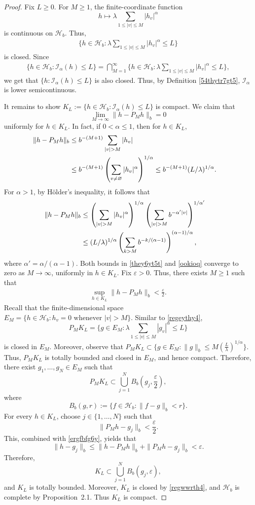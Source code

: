 \documentclass[a4paper, 11pt]{article}
\newcommand{\1}{\mathbf 1}
\theoremstyle{plain}
\begin{document}
\begin{proof}
Fix $L\geq0$. For \(M\geq1\), the finite-coordinate function
\[
  h\longmapsto
  \lambda\sum_{1\leq|v|\leq M}|h_v|^\alpha
\]
is continuous on \(\mathcal{H}_b\). Thus,
\begin{align}\label{regeythy4}
\Big\{h\in\mathcal{H}_b: \lambda\sum_{1\leq|v|\leq M}|h_v|^\alpha\leq L\Big\}
\end{align}
 is closed. Since
\begin{align}\label{regwwrth4}
\{h\in\mathcal{H}_b:\mathcal{I_{\alpha}}(h)\leq L\}=\bigcap^{\infty}_{M=1}\Big\{h\in\mathcal{H}_b: \lambda\sum_{1\leq|v|\leq M}|h_v|^\alpha\leq L\Big\},
\end{align}
we get that $\{h:\mathcal{I_{\alpha}}(h)\leq L\}$ is also closed. Thus, by Definition \ref{54thytr7gt5}, $\mathcal{I_{\alpha}}$ is lower semicontinuous.
\par
 It remains to show \(K_L:=\{h\in\mathcal{H}_b:\mathcal{I_{\alpha}}(h)\leq L\}\) is compact.  We claim that
 $$\lim_{M\to\infty} \|h-P_Mh\|_b=0$$
uniformly for \(h\in K_L\). In fact, if
\(0<\alpha\leq1\), then for \(h\in K_L\),
\begin{align}\label{they6yt5t}
  \|h-P_Mh\|_b
  &\leq
  b^{-(M+1)}
  \sum_{|v|>M}|h_v|\cr
  &\leq  b^{-(M+1)}\left(\sum_{v\neq \varnothing}|h_v|^{\alpha}\right)^{1/\alpha}
  \leq
  b^{-(M+1)}(L/\lambda)^{1/\alpha}.
\end{align}
For \(\alpha>1\), by H\"older's inequality, it follows that
\begin{align}\label{ookioq}
  \|h-P_Mh\|_b
  &\leq
  \left(\sum_{|v|>M}|h_v|^\alpha\right)^{1/\alpha}
  \left(\sum_{|v|>M}b^{-\alpha'|v|}\right)^{1/\alpha'}\cr
  &\leq
  (L/\lambda)^{1/\alpha}
  \left(\sum_{k>M}b^{-k/(\alpha-1)}\right)^{(\alpha-1)/\alpha},
\end{align}
where \(\alpha'=\alpha/(\alpha-1)\). Both bounds in \eqref{they6yt5t} and \eqref{ookioq} converge to zero as \(M\to\infty\), uniformly in \(h\in K_L\). Fix \(\varepsilon>0\). Thus, there exists \(M\geq1\) such that
\begin{align}\label{ergfbfg6y}
\sup_{h\in K_L}\|h-P_Mh\|_b<\frac{\varepsilon}{2}.
\end{align}
Recall that the finite-dimensional space \(E_M=\{h\in\mathcal{H}_b:h_v=0\text{ whenever }|v|>M\}\). Similar to \eqref{regeythy4},
$$P_MK_L=\Bigg\{g\in E_M: \lambda\sum_{1\leq|v|\leq M}|g_v|^{\alpha}\leq L\Bigg\}$$
is closed in \(E_M\). Moreover, observe that $P_MK_L\subset\{g\in E_M: \|g\|_b\leq M(\frac{L}{\lambda})^{1/\alpha}\}$. Thus, $P_MK_L$ is totally bounded and closed in \(E_M\), and hence compact.  Therefore, there exist \(g_1,\ldots,g_N\in E_M\) such that
\[
P_MK_L
\subset
\bigcup_{j=1}^{N}
B_b\left(g_j,\frac{\varepsilon}{2}\right),
\]
where
\[
B_b(g,r):=\{f\in\mathcal H_b:\|f-g\|_b<r\}.
\]
For every \(h\in K_L\), choose \(j\in\{1,\ldots,N\}\) such that
\[
\|P_Mh-g_j\|_b<\frac{\varepsilon}{2}.
\]
This, combined with \eqref{ergfbfg6y}, yields that
\[
\|h-g_j\|_b
\leq
\|h-P_Mh\|_b+\|P_Mh-g_j\|_b
<\varepsilon.
\]
Therefore,
\[
K_L\subset\bigcup_{j=1}^{N}B_b(g_j,\varepsilon),
\]
and \(K_L\) is totally bounded. Moreover, \(K_L\) is closed by \eqref{regwwrth4}, and \(\mathcal H_b\) is complete by Proposition~2.1. Thus \(K_L\) is compact.
\end{proof}
\end{document}
